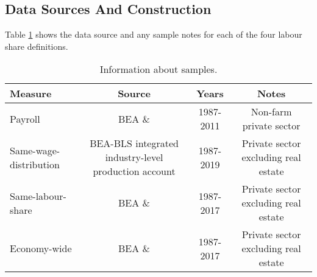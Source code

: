 \subsection{Data Sources And Construction \label{sec: data source}}

Table \ref{tab:data_source} shows the data source and any sample notes for each of the four labour share definitions. 


\begingroup
\renewcommand*{\arraystretch}{1.3}

\begin{table}[H]
    \centering
    \small
    \caption{\normalsize Information about samples.}
\begin{adjustbox}{angle=90}
    \begin{tabular}{l|ccc}
        
        \toprule[1.1pt]
        
        Measure & Source & Years & Notes \\

        \midrule[1.1pt]

        Payroll & BEA \& \citet{elsbyDeclineLaborShare2013a} & 1987-2011 & Non-farm private sector \\

        Same-wage-distribution & BEA-BLS integrated industry-level production account & 1987-2019 & Private sector excluding real estate \\

        Same-labour-share & BEA \& \citep{mendieta-munozDeclineUSLabor2021} & 1987-2017 & Private sector excluding real estate\\

        Economy-wide & BEA \& \citep{mendieta-munozDeclineUSLabor2021}  & 1987-2017 & Private sector excluding real estate\\


        \bottomrule[1.1pt]
    \end{tabular}
\end{adjustbox}
    \label{tab:data_source}
\end{table}

\endgroup


